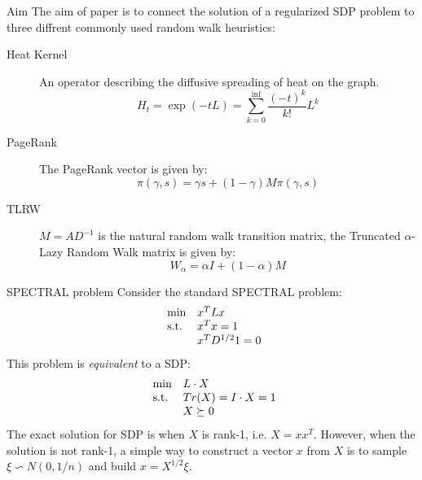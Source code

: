 \documentclass[handout]{beamer}
\begin{document}
    \begin{frame}{Aim}
        The aim of paper \cite{mahoney2010implementing} is to connect the solution of a regularized SDP problem to three diffrent commonly used random walk heuristics:
        \begin{description}
        \item[Heat Kernel]
        An operator describing the diffusive spreading of heat on the graph.
        $$ H_t = \exp{(-tL)} = \sum_{k=0}^{\inf} \frac{(-t)^k}{k!}L^k $$
        \pause
        \item[PageRank]
        The PageRank vector is given by:
        $$ \pi(\gamma, s) = \gamma s + (1-\gamma)M\pi(\gamma,s) $$
        \pause
        \item[TLRW]
        $M = AD^{-1}$ is the natural random walk transition matrix, the Truncated $\alpha$-Lazy Random Walk matrix is given by:
        $$ W_\alpha = \alpha I + (1-\alpha)M $$
        \end{description}
    \end{frame}

    \begin{frame}{SPECTRAL problem}
        \pause
        Consider the standard SPECTRAL problem:
        \begin{equation*}
            \begin{array}{ll@{}ll}
            \text{min} & x^TLx \\
            \text{s.t.}& x^Tx = 1\\
                       & x^TD^{1/2}1 = 0
            \end{array}
        \end{equation*}
        \pause
        This problem is \textit{equivalent} to a SDP:
        \begin{equation*}
            \begin{array}{ll@{}ll}
            \text{min} & L \cdot X \\
            \text{s.t.}& Tr(X) = I \cdot X = 1\\
                       & X \succeq 0
            \end{array}
        \end{equation*}
        \pause
    The exact solution for SDP is when $X$ is rank-1, i.e. $X=xx^T$. However, when the solution is not rank-1, a simple way to construct a vector $x$ from $X$ is to sample $\xi \backsim N(0,1/n)$ and build $x = X^{1/2} \xi$.
    \end{frame}
    
\end{document}
